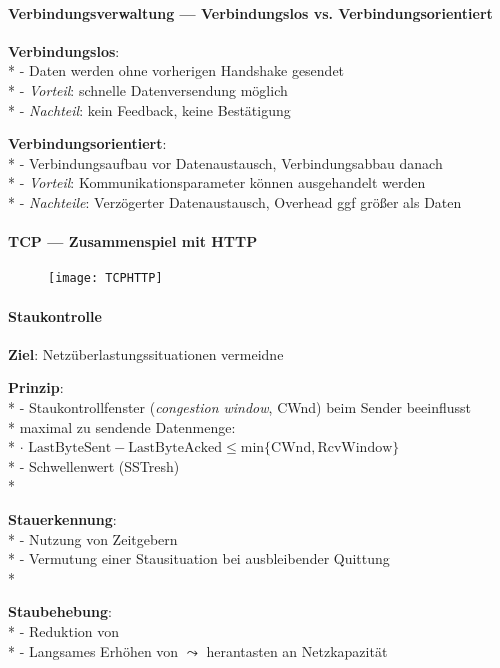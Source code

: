 \paragraph{Verbindungsverwaltung --- Verbindungslos vs. Verbindungsorientiert}
\begin{items}
  \item \textbf{Verbindungslos}: \\*
    - Daten werden ohne vorherigen Handshake gesendet \\*
    - \emph{Vorteil}: schnelle Datenversendung möglich \\*
    - \emph{Nachteil}: kein Feedback, keine Bestätigung
  \item \textbf{Verbindungsorientiert}: \\*
    - Verbindungsaufbau vor Datenaustausch, Verbindungsabbau danach \\*
    - \emph{Vorteil}: Kommunikationsparameter können ausgehandelt werden \\*
    - \emph{Nachteile}: Verzögerter Datenaustausch, Overhead ggf größer als Daten
\end{items}

\paragraph{TCP --- Zusammenspiel mit HTTP}
\begin{figure}[H]\centering\label{TCPHTTP}\texttt{[image: TCPHTTP]}\end{figure}

\paragraph{Staukontrolle}
\begin{items}
  \item \textbf{Ziel}: Netzüberlastungssituationen vermeidne
  \item \textbf{Prinzip}: \\*
    - Staukontrollfenster (\emph{congestion window}, CWnd) beim Sender beeinflusst \\* \phantom{-} \phantom{\( \cdot \)} maximal zu sendende Datenmenge: \\* \phantom{-} \( \cdot \) \( \text{LastByteSent} - \text{LastByteAcked} \leq \text{min} \{ \text{CWnd}, \text{RcvWindow} \} \) \\*
    - Schwellenwert (SSTresh) \\*
  \item \textbf{Stauerkennung}: \\*
    - Nutzung von Zeitgebern \\*
    - Vermutung einer Stausituation bei ausbleibender Quittung \\*
  \item \textbf{Staubehebung}: \\*
    - Reduktion von  \\*
    - Langsames Erhöhen von  \( \leadsto \) herantasten an Netzkapazität
\end{items}

